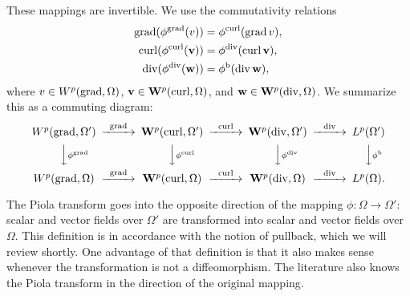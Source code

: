 \documentclass[12pt,a4paper]{article}
\begin{document}
These mappings are invertible. 
%
%
We use the commutativity relations 
\begin{subequations}\label{eq_piola_commute}
\begin{align}
    \operatorname{grad} (\phi^{\operatorname{grad}} (v)) &= \phi^{\operatorname{curl}}(\operatorname{grad} v), 
    \\
    \operatorname{curl} (\phi^{\operatorname{curl}}({\mathbf v})) &= \phi^{\operatorname{div}}(\operatorname{curl} {\mathbf v}), 
    \\
    \operatorname{div} (\phi^{\operatorname{div}}({\mathbf w})) &= \phi^{\rm b}(\operatorname{div} {\mathbf w}),
\end{align}
\end{subequations}
where $v \in W^{p}(\operatorname{grad},\Omega)$, ${\mathbf v} \in {\mathbf W}^{p}(\operatorname{curl},\Omega)$, and ${\mathbf w} \in {\mathbf W}^{p}(\operatorname{div},\Omega)$.  
We summarize this as a commuting diagram:
\begin{align*}
    \begin{CD}
        W^{p}(\grad,\Omega') @>{\grad}>> \bfW^{p}(\curl,\Omega') @>{\curl}>> \bfW^{p}(\divergence,\Omega') @>{\divergence}>> L^{p}(\Omega')
        \\
        @VV{\phi^{\grad}}V 
        @VV{\phi^{\curl}}V 
        @VV{\phi^{\divergence}}V 
        @VV{\phi^{\rm b}}V 
        \\
        W^{p}(\grad,\Omega ) @>{\grad}>> \bfW^{p}(\curl,\Omega ) @>{\curl}>> \bfW^{p}(\divergence,\Omega ) @>{\divergence}>> L^{p}(\Omega ).
    \end{CD}
\end{align*}

\begin{remark}
    The Piola transform goes into the opposite direction of the mapping $\phi : \Omega \rightarrow \Omega'$:
    scalar and vector fields over $\Omega'$ are transformed into scalar and vector fields over $\Omega$.
    This definition is in accordance with the notion of pullback, which we will review shortly. 
    One advantage of that definition is that it also makes sense whenever the transformation is not a diffeomorphism. 
    The literature also knows the Piola transform in the direction of the original mapping. 
\end{remark}



%
%


\end{document}
